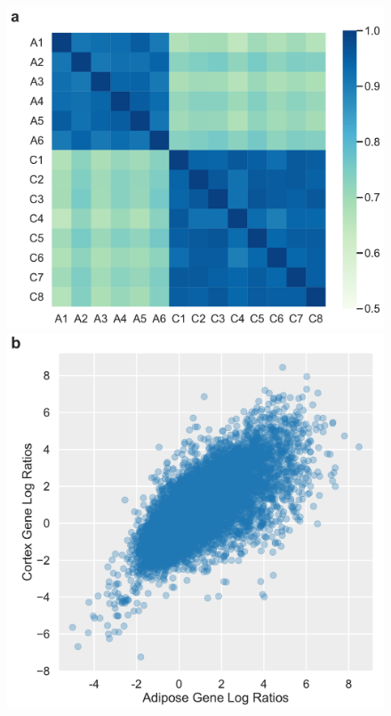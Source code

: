 \begin{figure}
\centering
\begin{multicols}{2}
\includegraphics[scale=.3]{chapter2/figures/supfig3a.pdf}\par
\includegraphics[scale=\figscale]{chapter2/figures/supfig3b.pdf}\par
\end{multicols}

\end{figure}
